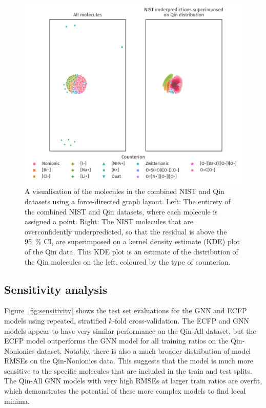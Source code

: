 \begin{figure}
    \includegraphics[width=\textwidth]{images/force-graph.pdf}
    \caption{A visualisation of the molecules in the combined NIST and Qin
        datasets using a force-directed graph layout. Left: The entirety of the
        combined NIST and Qin datasets, where each molecule is assigned a point.
        Right: The NIST molecules that are overconfidently underpredicted, so
        that the residual is above the \SI{95}{\%} CI, are superimposed on a
        kernel density estimate (KDE) plot of the Qin data. This KDE plot is an
        estimate of the distribution of the Qin molecules on the left, coloured
        by the type of counterion.}
    \label{fig:fdg}
\end{figure}

\subsection{Sensitivity analysis}

Figure~\ref{fig:sensitivity} shows the test set evaluations for the GNN and ECFP
models using repeated, stratified $k$-fold cross-validation. The ECFP and GNN
models appear to have very similar performance on the Qin-All dataset, but the
ECFP model outperforms the GNN model for all training ratios on the
Qin-Nonionics dataset. Notably, there is also a much broader distribution of
model RMSEs on the Qin-Nonionics data. This suggests that the model is much more
sensitive to the specific molecules that are included in the train and test
splits. The Qin-All GNN models with very high RMSEs at larger train ratios are
overfit, which demonstrates the potential of these more complex models to find
local minima.

